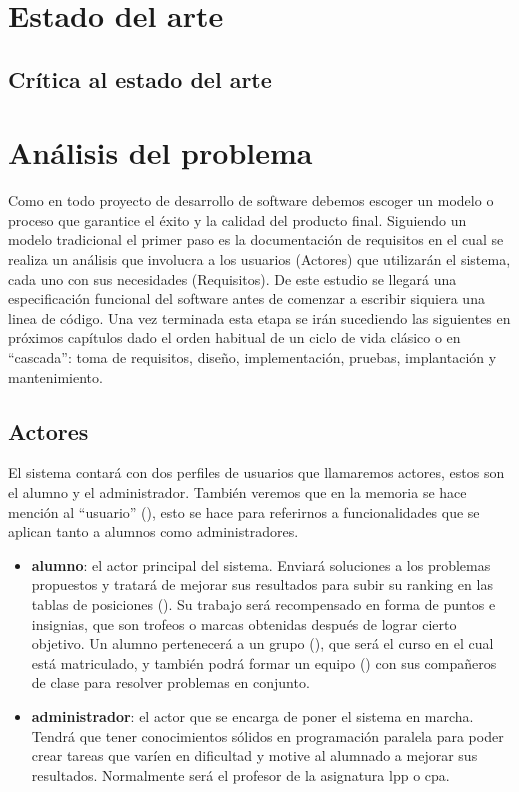\documentclass[11pt,spanish,listoffigures,listoftables]{tfgetsinf}
\begin{document}
\chapter{Estado del arte}

\section{Crítica al estado del arte}


\chapter{Análisis del problema}

Como en todo proyecto de desarrollo de software debemos escoger un modelo o proceso que garantice el éxito y la calidad del producto final. Siguiendo un modelo tradicional el primer paso es la documentación de requisitos \cite{libingreq} en el cual se realiza un análisis que involucra a los usuarios (Actores) que utilizarán el sistema, cada uno con sus necesidades (Requisitos). De este estudio se llegará una especificación funcional del software antes de comenzar a escribir siquiera una linea de código. Una vez terminada esta etapa se irán sucediendo las siguientes en próximos capítulos dado el orden habitual de un ciclo de vida clásico \cite{libingsoft} o en ``cascada'': toma de requisitos, diseño, implementación, pruebas, implantación y mantenimiento.

\section{Actores}

El sistema contará con dos perfiles de usuarios que llamaremos actores, estos son el \Gls{alumno} y el \Gls{administrador}. También veremos que en la memoria se hace mención al ``usuario'' (), esto se hace para referirnos a funcionalidades que se aplican tanto a \gls{alumno}s como \gls{administrador}es.

\begin{itemize}
    \item \textbf{\gls{alumno}}: el actor principal del sistema. Enviará soluciones a los problemas propuestos y tratará de mejorar sus resultados para subir su ranking en las tablas de posiciones (). Su trabajo será recompensado en forma de puntos e insignias, que son trofeos o marcas obtenidas después de lograr cierto objetivo. Un alumno pertenecerá a un \gls{grupo} (), que será el curso en el cual está matriculado, y también podrá formar un \gls{equipo} () con sus compañeros de clase para resolver problemas en conjunto.
	\item \textbf{\gls{administrador}}: el actor que se encarga de poner el sistema en marcha. Tendrá que tener conocimientos sólidos en programación paralela para poder crear \gls{tarea}s que varíen en dificultad y motive al alumnado a mejorar sus resultados. Normalmente será el profesor de la asignatura \acrshort{lpp} o \acrshort{cpa}.
\end{itemize}
\end{document}
